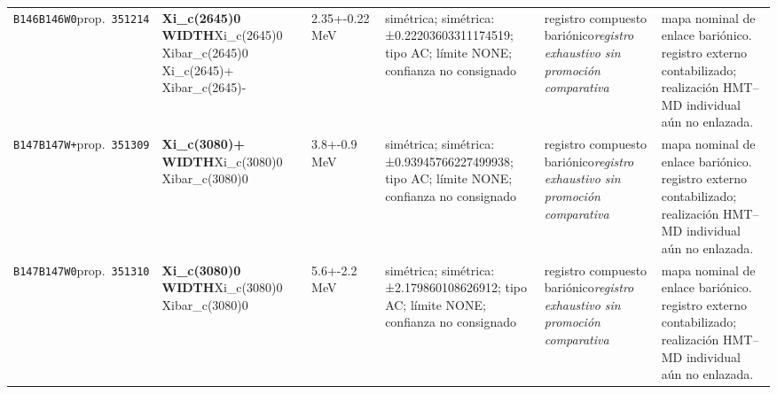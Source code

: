 \begin{landscape}
\begin{longtable}{L{1.85cm}L{4.45cm}L{2.35cm}L{4.05cm}L{3.35cm}L{7.15cm}}
\texttt{B146}\newline \texttt{B146W0}\newline prop.\ \texttt{351214} & \textbf{Xi\_\allowbreak{}c(2645)0 WIDTH}\newline Xi\_\allowbreak{}c(2645)0 \textbar{}\allowbreak{} Xibar\_\allowbreak{}c(2645)0 \textbar{}\allowbreak{} Xi\_\allowbreak{}c(2645)+ \textbar{}\allowbreak{} Xibar\_\allowbreak{}c(2645)- & 2.35+-0.22\,MeV & simétrica; simétrica: ±0.22203603311174519; tipo AC; límite NONE; confianza no consignado & registro compuesto bariónico\newline \emph{registro exhaustivo sin promoción comparativa} & mapa nominal de enlace bariónico. registro externo contabilizado; realización HMT--MD individual aún no enlazada. \\
\texttt{B147}\newline \texttt{B147W+}\newline prop.\ \texttt{351309} & \textbf{Xi\_\allowbreak{}c(3080)+ WIDTH}\newline Xi\_\allowbreak{}c(3080)0 \textbar{}\allowbreak{} Xibar\_\allowbreak{}c(3080)0 & 3.8+-0.9\,MeV & simétrica; simétrica: ±0.93945766227499938; tipo AC; límite NONE; confianza no consignado & registro compuesto bariónico\newline \emph{registro exhaustivo sin promoción comparativa} & mapa nominal de enlace bariónico. registro externo contabilizado; realización HMT--MD individual aún no enlazada. \\
\texttt{B147}\newline \texttt{B147W0}\newline prop.\ \texttt{351310} & \textbf{Xi\_\allowbreak{}c(3080)0 WIDTH}\newline Xi\_\allowbreak{}c(3080)0 \textbar{}\allowbreak{} Xibar\_\allowbreak{}c(3080)0 & 5.6+-2.2\,MeV & simétrica; simétrica: ±2.179860108626912; tipo AC; límite NONE; confianza no consignado & registro compuesto bariónico\newline \emph{registro exhaustivo sin promoción comparativa} & mapa nominal de enlace bariónico. registro externo contabilizado; realización HMT--MD individual aún no enlazada. \\

\end{longtable}
\end{landscape}
